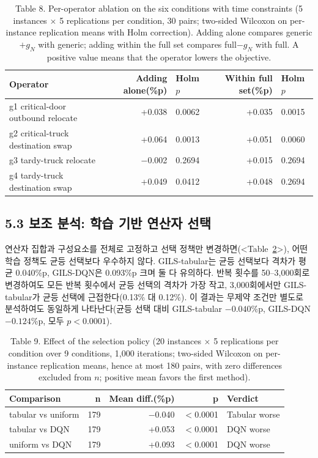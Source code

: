 \documentclass[10pt,a4paper]{article}
\begin{document}
\begin{table}[H]\centering
\caption{Table 8. Per-operator ablation on the six conditions with time constraints (5 instances $\times$ 5 replications per condition, 30 pairs; two-sided Wilcoxon on per-instance replication means with Holm correction). Adding alone compares generic$+g_N$ with generic; adding within the full set compares full$-g_N$ with full. A positive value means that the operator lowers the objective.}
\label{tab:bind}\small
\begin{tabular}{@{}lrlrl@{}}
\toprule
Operator & Adding alone(\%p) & Holm $p$ & Within full set(\%p) & Holm $p$\\
\midrule
g1 critical-door outbound relocate & +0.038 & 0.0062 & +0.035 & 0.0015\\
g2 critical-truck destination swap & +0.064 & 0.0013 & +0.051 & 0.0060\\
g3 tardy-truck relocate & $-$0.002 & 0.2694 & +0.015 & 0.2694\\
g4 tardy-truck destination swap & +0.049 & 0.0412 & +0.048 & 0.2694\\
\bottomrule
\end{tabular}
\end{table}

\subsection{5.3 보조 분석: 학습 기반 연산자 선택}
연산자 집합과 구성요소를 전체로 고정하고 선택 정책만 변경하면(<Table~\ref{tab:sel}>), 어떤
학습 정책도 균등 선택보다 우수하지 않다. GILS-tabular는 균등 선택보다 격차가 평균 0.040\%p, GILS-DQN은
0.093\%p 크며 둘 다 유의하다. 반복 횟수를 50--3{,}000회로 변경하여도 모든 반복 횟수에서 균등 선택의 격차가
가장 작고, 3{,}000회에서만 GILS-tabular가 균등 선택에 근접한다(0.13\% 대 0.12\%).
이 결과는 무제약 조건만 별도로 분석하여도 동일하게 나타난다(균등 선택 대비 GILS-tabular $-0.040$\%p, GILS-DQN $-0.124$\%p, 모두 $p<0.0001$).

\begin{table}[H]\centering
\caption{Table 9. Effect of the selection policy (20 instances $\times$ 5 replications per condition over 9 conditions, 1,000 iterations; two-sided Wilcoxon on per-instance replication means, hence at most 180 pairs, with zero differences excluded from $n$; positive mean favors the first method).}
\label{tab:sel}\small
\begin{tabular}{@{}lrrrl@{}}
\toprule
Comparison & n & Mean diff.(\%p) & p & Verdict\\
\midrule
tabular vs uniform & 179 & $-$0.040 & $<$0.0001 & Tabular worse\\
tabular vs DQN & 179 & +0.053 & $<$0.0001 & DQN worse\\
uniform vs DQN & 179 & +0.093 & $<$0.0001 & DQN worse\\
\bottomrule
\end{tabular}
\end{table}
\end{document}
